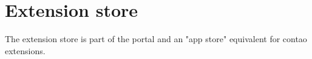\label{sec:extension store} 
\chapter{Extension store}


The extension store is part of the portal and an "app store" equivalent for contao extensions.
